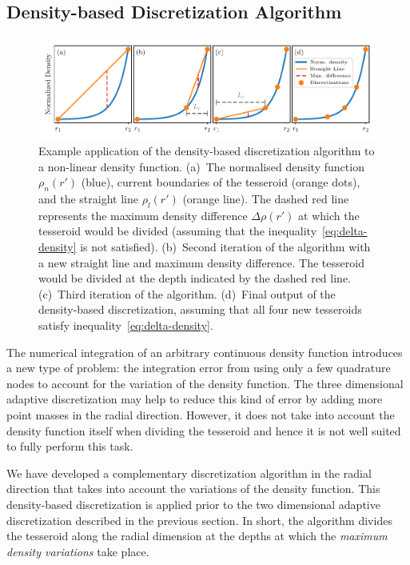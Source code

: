 \documentclass[extra, referee]{gji}
\begin{document}
\subsection{Density-based Discretization Algorithm}

\begin{figure}
\centering
\includegraphics[width=\linewidth]
    {figures/density-based-discretization-algorithm.pdf}
\caption{
    Example application of the density-based discretization algorithm to a non-linear
    density function.
    (a)~The normalised density function $\rho_n(r')$ (blue), current boundaries of the
    tesseroid (orange dots), and the straight line $\rho_l(r')$ (orange line).
    The dashed red line represents the maximum density difference $\Delta \rho (r')$ at
    which the tesseroid would be divided (assuming that the
    inequality~\ref{eq:delta-density} is not satisfied).
    (b)~Second iteration of the algorithm with a new straight line and maximum
    density difference. The tesseroid would be divided at the depth indicated by the
    dashed red line.
    (c)~Third iteration of the algorithm.
    (d)~Final output of the density-based discretization, assuming that all four new
    tesseroids satisfy inequality~\ref{eq:delta-density}.
}
\label{fig:density-discretization-algorithm}
\end{figure}

The numerical integration of an arbitrary continuous density function introduces a new
type of problem: the integration error from using only a few quadrature nodes to account
for the variation of the density function.
The three dimensional adaptive discretization may help to reduce this kind of error by
adding more point masses in the radial direction.
However, it does not take into account the density function itself when dividing the
tesseroid and hence it is not well suited to fully perform this task.

We have developed a complementary discretization algorithm in the radial direction that
takes into account the variations of the density function.
This density-based discretization is applied prior to the two dimensional adaptive
discretization described in the previous section.
In short, the algorithm divides the tesseroid along the radial dimension at the
depths at which the \emph{maximum density variations} take place.
\end{document}
